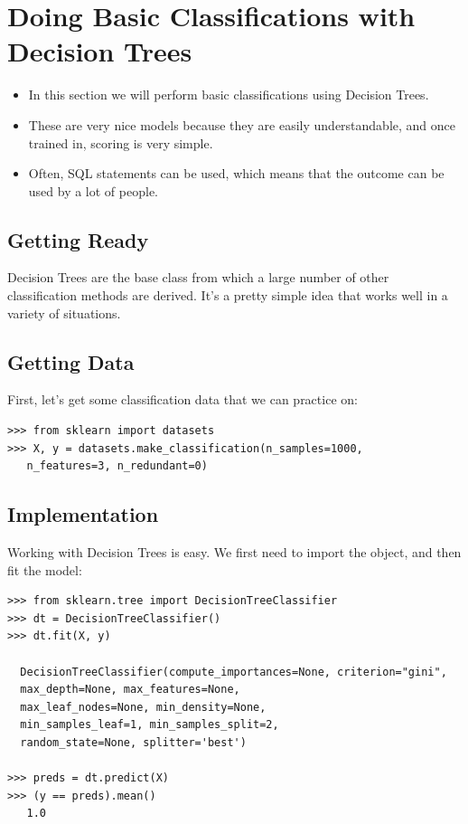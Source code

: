 \documentclass[SKL-MASTER.tex]{subfiles}
\begin{document}
	\Large
\section*{Doing Basic Classifications with Decision Trees}
\begin{itemize}
\item In this section we will perform basic classifications using Decision Trees. 
\item These are very nice
models because they are easily understandable, and once trained in, scoring is very simple.
\item Often, SQL statements can be used, which means that the outcome can be used by a lot
of people.
\end{itemize}

\subsection*{Getting Ready}
Decision Trees are the base class
from which a large number of other classification methods are derived. It's a pretty simple
idea that works well in a variety of situations.

\subsection*{Getting Data}
First, let's get some classification data that we can practice on:
\begin{framed}
\begin{verbatim}
>>> from sklearn import datasets
>>> X, y = datasets.make_classification(n_samples=1000, 
   n_features=3, n_redundant=0)
\end{verbatim}
\end{framed}
\subsection{Implementation} %
Working with Decision Trees is easy. We first need to import the object, and then fit the model:
\begin{framed}
\begin{verbatim}
>>> from sklearn.tree import DecisionTreeClassifier
>>> dt = DecisionTreeClassifier()
>>> dt.fit(X, y)

  DecisionTreeClassifier(compute_importances=None, criterion="gini",
  max_depth=None, max_features=None,
  max_leaf_nodes=None, min_density=None,
  min_samples_leaf=1, min_samples_split=2,
  random_state=None, splitter='best')
  
>>> preds = dt.predict(X)
>>> (y == preds).mean()
   1.0
\end{verbatim}
\end{framed}
\end{document}
